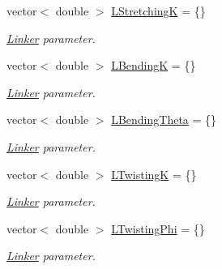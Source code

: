 {\bf }\par
\begin{DoxyCompactItemize}
\item 
vector$<$ double $>$ \hyperlink{structMechanicsParameters_aea1e85562167210db74aa3ffd0013bd7}{L\+Stretching\+K} = \{\}
\begin{DoxyCompactList}\small\item\em \hyperlink{classLinker}{Linker} parameter. \end{DoxyCompactList}\item 
vector$<$ double $>$ \hyperlink{structMechanicsParameters_a4538f8a7ee3c71f1eda540bc41614a55}{L\+Bending\+K} = \{\}
\begin{DoxyCompactList}\small\item\em \hyperlink{classLinker}{Linker} parameter. \end{DoxyCompactList}\item 
vector$<$ double $>$ \hyperlink{structMechanicsParameters_aab9d6facd9ba3939017117cd5bff60db}{L\+Bending\+Theta} = \{\}
\begin{DoxyCompactList}\small\item\em \hyperlink{classLinker}{Linker} parameter. \end{DoxyCompactList}\item 
vector$<$ double $>$ \hyperlink{structMechanicsParameters_a6629c1138e0a0662f6156fe67431f690}{L\+Twisting\+K} = \{\}
\begin{DoxyCompactList}\small\item\em \hyperlink{classLinker}{Linker} parameter. \end{DoxyCompactList}\item 
vector$<$ double $>$ \hyperlink{structMechanicsParameters_a8cc146be39259d4b1edd94b70d9b1832}{L\+Twisting\+Phi} = \{\}
\begin{DoxyCompactList}\small\item\em \hyperlink{classLinker}{Linker} parameter. \end{DoxyCompactList}\end{DoxyCompactItemize}

